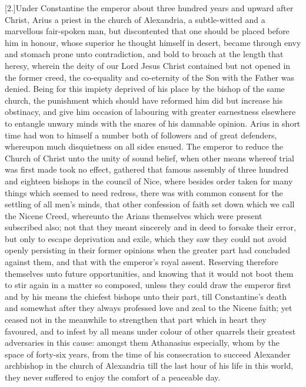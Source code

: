 [2.]Under Constantine the emperor about three hundred years and upward after Christ, Arius a priest in the church of Alexandria, a subtle-witted and a marvellous fair-spoken man,  but discontented that one should be placed before him in honour, whose superior he thought himself in desert, became through envy and stomach prone unto contradiction, and bold to broach at the length that heresy, wherein the deity of our Lord Jesus Christ contained but not opened in the former creed, the co-equality and co-eternity of the Son with the Father was denied. Being for this impiety deprived of his place by the bishop of the same church, the punishment which should have reformed him did but increase his obstinacy, and give him occasion of labouring with greater earnestness elsewhere to entangle unwary minds with the snares of his damnable opinion. Arius in short time had won to himself a number both of followers and of great defenders, whereupon much disquietness on all sides ensued. The emperor to reduce the Church of Christ unto the unity of sound belief, when other means whereof trial was first made took no effect, gathered that famous assembly of three hundred and eighteen bishops in the council of Nice, where besides order taken for many things which seemed to need redress, there was with common consent for the settling of all men’s minds, that other confession of faith set down which we call the Nicene Creed, whereunto the Arians themselves which were present subscribed also; not that they meant sincerely and in deed to forsake their error, but only to escape deprivation and exile, which they saw they could not avoid openly persisting in their former opinions when the greater part had concluded against them, and that with the emperor’s royal assent. Reserving therefore themselves unto future opportunities, and knowing that it would not boot them to stir again in a matter so composed, unless they could draw the emperor first and by his means the chiefest bishops unto their part, till Constantine’s death and somewhat after they always professed love and zeal to the Nicene faith; yet ceased not in the meanwhile to strengthen that part which in heart they favoured, and to infest by all means under colour of other quarrels their greatest adversaries in this cause: amongst them Athanasius especially, whom by the space of forty-six years, from the time of his consecration to succeed Alexander archbishop in the church of Alexandria till the last hour of his life in this world, they never suffered to enjoy the comfort of a peaceable  day.
